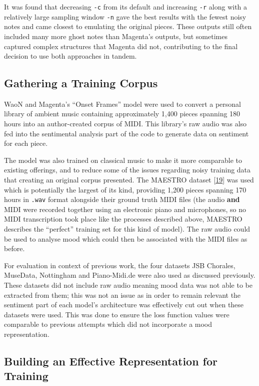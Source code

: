 \documentclass[12pt,]{article}
\begin{document}
It was found that decreasing \texttt{-c} from its default and increasing
\texttt{-r} along with a relatively large sampling window \texttt{-n}
gave the best results with the fewest noisy notes and came closest to
emulating the original pieces. These outputs still often included many
more ghost notes than Magenta's outputs, but sometimes captured complex
structures that Magenta did not, contributing to the final decision to
use both approaches in tandem.

\hypertarget{gathering-a-training-corpus}{%
\subsection{Gathering a Training
Corpus}\label{gathering-a-training-corpus}}

WaoN and Magenta's ``Onset Frames'' model were used to convert a
personal library of ambient music containing approximately 1,400 pieces
spanning 180 hours into an author-created corpus of MIDI. This library's
raw audio was also fed into the sentimental analysis part of the code to
generate data on sentiment for each piece.

The model was also trained on classical music to make it more comparable
to existing offerings, and to reduce some of the issues regarding noisy
training data that creating an original corpus presented. The MAESTRO
dataset {[}\protect\hyperlink{ref-maestro2018}{19}{]} was used which is
potentially the largest of its kind, providing 1,200 pieces spanning 170
hours in \texttt{.wav} format alongside their ground truth MIDI files
(the audio \textbf{and} MIDI were recorded together using an electronic
piano and microphones, so no MIDI transcription took place like the
processes described above, MAESTRO describes the ``perfect'' training
set for this kind of model). The raw audio could be used to analyse mood
which could then be associated with the MIDI files as before.

For evaluation in context of previous work, the four datasets JSB
Chorales, MuseData, Nottingham and Piano-Midi.de were also used as
discussed previously. These datasets did not include raw audio meaning
mood data was not able to be extracted from them; this was not an issue
as in order to remain relevant the sentiment part of each model's
architecture was effectively cut out when these datasets were used. This
was done to ensure the loss function values were comparable to previous
attempts which did not incorporate a mood representation.

\hypertarget{building-an-effective-representation-for-training}{%
\subsection{Building an Effective Representation for
Training}\label{building-an-effective-representation-for-training}}
\end{document}
